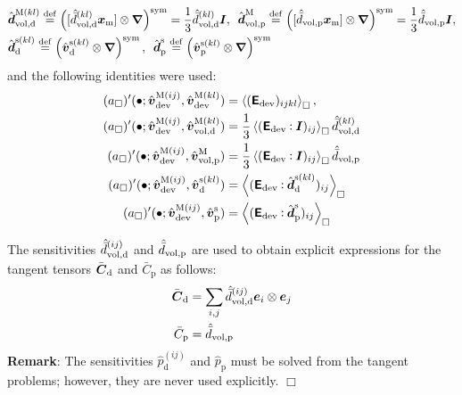 \documentclass[10pt,a4paper]{article}
\newcommand{\ded}{\mathrm{d}}
\newcommand{\dep}{\mathrm{p}}
\begin{document}
\begin{align}
    & \hat{\ts{d}}^{\macro(kl)}_{\vol,\ded}\defeq\left([\hat{\bar{d}}^{(kl)}_{\vol,\ded}\ta{x}_\mean]\outerp\diff\right)^\sym = \frac{1}{3}\hat{\bar{d}}^{(kl)}_{\vol,\ded}\ts{I}, \,\,\,
    \hat{\ts{d}}^{\macro}_{\vol,\dep}\defeq\left([\hat{\bar{d}}_{\vol,\dep}\ta{x}_\mean]\outerp\diff\right)^\sym = \frac{1}{3}\hat{\bar{d}}_{\vol,\dep}\ts{I},
\nonumber \\
    & \hat{\ts{d}}^{\fluct(kl)}_\ded\defeq\left(\hat{\ta{v}}^{\fluct(kl)}_\ded\outerp\diff\right)^\sym, \,\,\,
    \hat{\ts{d}}^{\fluct}_\dep\defeq\left(\hat{\ta{v}}^{\fluct(kl)}_\dep\outerp\diff\right)^\sym
\label{eq227}
\end{align}
and the following identities were used:
\begin{align}
    ({a}_\Box)'(\bullet;\hat{\ta{v}}^{\macro(ij)}_\dev,\hat{\ta{v}}^{\macro(kl)}_\dev)
    & = 
    \left\langle({\tf E}_\dev)_{ijkl}\right\rangle_\Box,
\label{eq225a} \\
    ({a}_\Box)'(\bullet;\hat{\ta{v}}^{\macro(ij)}_\dev,\hat{\ta{v}}^{\macro(kl)}_{\vol,\ded})
    & = 
    \frac{1}{3}\left\langle ({\tf E}_\dev\dprod \ts{I})_{ij} \right\rangle_\Box\hat{\bar{d}}^{(kl)}_{\vol,\ded}
\label{eq225b} \\
    ({a}_\Box)'(\bullet;\hat{\ta{v}}^{\macro(ij)}_\dev,\hat{\ta{v}}^{\macro}_{\vol,\dep})
    & = 
    \frac{1}{3}\left\langle ({\tf E}_\dev\dprod \ts{I})_{ij} \right\rangle_\Box\hat{\bar{d}}_{\vol,\dep}
\label{eq225c} \\
    ({a}_\Box)'(\bullet;\hat{\ta{v}}^{\macro(ij)}_\dev,\hat{\ta{v}}^{\fluct(kl)}_\ded)
    & = 
    \left\langle ({\tf E}_\dev\dprod \hat{\ts{d}}^{\fluct(kl)}_\ded)_{ij} \right\rangle_\Box
\label{eq225d} \\
    ({a}_\Box)'(\bullet;\hat{\ta{v}}^{\macro(ij)}_\dev,\hat{\ta{v}}^{\fluct}_\dep)
    & = 
    \left\langle ({\tf E}_\dev\dprod \hat{\ts{d}}^{\fluct}_\dep)_{ij} \right\rangle_\Box
\label{eq225e}
\end{align}

The sensitivities $\hat{\bar{d}}^{(ij)}_{\vol,\ded}$ and $\hat{\bar{d}}_{\vol,\dep}$ are used to obtain explicit expressions for the tangent tensors
$\bar{\ts C}_\ded$ and $\bar{C}_\dep$ as follows:
\begin{align}
    \bar{\ts C}_\ded
    & = 
    \sum_{i,j}\hat{\bar{d}}^{(ij)}_{\vol,\ded} \bee ij
\label{eq234a} \\
    \bar{C}_\dep
    & = 
    \hat{\bar{d}}_{\vol,\dep}
\label{eq234b}
\end{align}
\textbf{Remark}: The sensitivities $\hat{p}^{(ij)}_\ded$ and $\hat{p}_\dep$ must be solved from the tangent problems; however, they are never used explicitly. $\Box$
\end{document}
